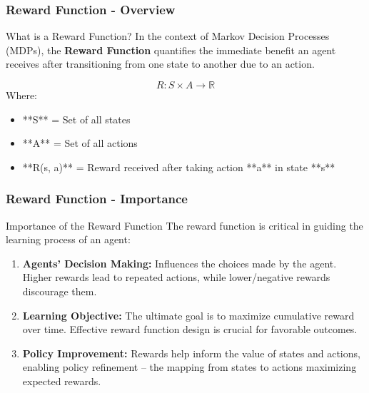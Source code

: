\documentclass[aspectratio=169]{beamer}
\begin{document}
\begin{frame}[fragile]
    \frametitle{Reward Function - Overview}
    \begin{block}{What is a Reward Function?}
        In the context of Markov Decision Processes (MDPs), the \textbf{Reward Function} quantifies the immediate benefit an agent receives after transitioning from one state to another due to an action. 
    \end{block}
    \begin{equation}
        R: S \times A \rightarrow \mathbb{R}
    \end{equation}
    Where:
    \begin{itemize}
        \item **S** = Set of all states
        \item **A** = Set of all actions
        \item **R(s, a)** = Reward received after taking action **a** in state **s**
    \end{itemize}
\end{frame}

\begin{frame}[fragile]
    \frametitle{Reward Function - Importance}
    \begin{block}{Importance of the Reward Function}
        The reward function is critical in guiding the learning process of an agent:
    \end{block}
    \begin{enumerate}
        \item \textbf{Agents’ Decision Making:} Influences the choices made by the agent. Higher rewards lead to repeated actions, while lower/negative rewards discourage them.
        \item \textbf{Learning Objective:} The ultimate goal is to maximize cumulative reward over time. Effective reward function design is crucial for favorable outcomes.
        \item \textbf{Policy Improvement:} Rewards help inform the value of states and actions, enabling policy refinement – the mapping from states to actions maximizing expected rewards.
    \end{enumerate}
\end{frame}
\end{document}
